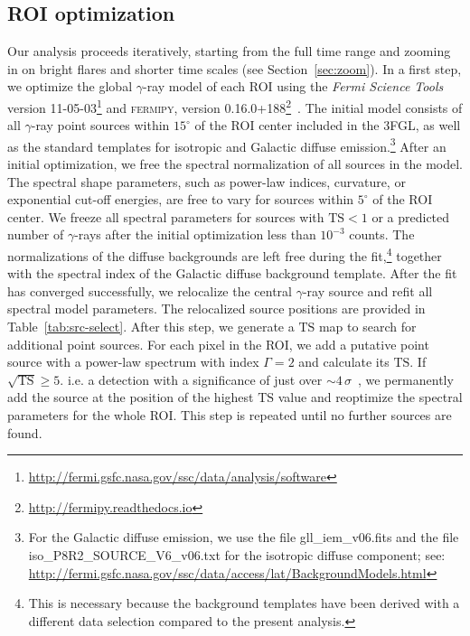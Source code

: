 \documentclass[twocolumn]{aastex62}
\newcommand{\Grays}{$\gamma$-rays\xspace}
\newcommand{\gray}{$\gamma$-ray\xspace}
\begin{document}
\subsection{ROI optimization}
\label{sec:roi}

Our analysis proceeds iteratively, starting from the full time range and zooming in on bright flares and shorter time scales (see Section~\ref{sec:zoom}).
In a first step, we optimize the global \gray model of each ROI using the \textit{Fermi Science Tools} version 11-05-03\footnote{\url{http://fermi.gsfc.nasa.gov/ssc/data/analysis/software}} and \textsc{fermipy}, version 0.16.0+188\footnote{\url{http://fermipy.readthedocs.io}}~\citep{fermipy}.
The initial model consists of all \gray point sources within $15^\circ$ of the ROI center included in the 3FGL, as well as the standard templates for isotropic and Galactic diffuse emission.\footnote{For the Galactic diffuse emission, we use the file gll\_iem\_v06.fits and the file iso\_P8R2\_SOURCE\_V6\_v06.txt for the isotropic diffuse component; see: \url{ http://fermi.gsfc.nasa.gov/ssc/data/access/lat/BackgroundModels.html}}
After an initial optimization, we free the spectral normalization of all sources in the model. 
The spectral shape parameters, such as power-law indices, curvature, or exponential cut-off energies, are free to vary for sources within $5^\circ$ of the ROI center. 
We freeze all spectral parameters for sources with $\mathrm{TS} < 1$ or a predicted number of \Grays after the initial optimization less than $10^{-3}$ counts.
The normalizations of the diffuse backgrounds are left free during the fit,\footnote{
This is necessary because the background templates have been derived with a different data selection compared to the present analysis.
}
together with the spectral index of the Galactic diffuse background template.
After the fit has converged successfully, 
we relocalize the central \gray source and refit all spectral model parameters. The relocalized source positions are provided in Table~\ref{tab:src-select}.
After this step, we generate a $\mathrm{TS}$ map to search for additional point sources. For each pixel in the ROI, we add a putative point source with a power-law spectrum with index $\Gamma = 2$ and calculate its $\mathrm{TS}$. If  $\sqrt{\mathrm{TS}} \geqslant 5$. i.e.  a detection with a significance of just over $\sim 4\,\sigma$~\citep{3fgl}, we permanently add the source at the position of the highest $\mathrm{TS}$ value and reoptimize the spectral parameters for the whole ROI. This step is repeated until no further sources are found.
\end{document}
